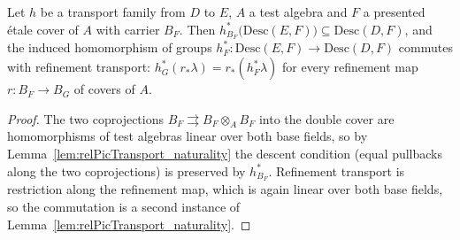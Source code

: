 \begin{lemma}
  \label{lem:relPicTransport_descent}
  \leanok
  Let \(h\) be a transport family from \(D\) to \(E\), \(A\) a test algebra and \(F\) a
  presented \'etale cover of \(A\) with carrier \(B_F\). Then
  \(h_{B_F}^{*}\bigl(\mathrm{Desc}(E, F)\bigr) \subseteq \mathrm{Desc}(D, F)\), and the
  induced homomorphism of groups
  \(h_F^{*} \colon \mathrm{Desc}(E, F) \to \mathrm{Desc}(D, F)\) commutes with refinement
  transport: \(h_{G}^{*}(r_{*}\lambda) = r_{*}(h_F^{*}\lambda)\) for every refinement map
  \(r \colon B_F \to B_G\) of covers of \(A\).
\end{lemma}
\begin{proof}
  \leanok
  The two coprojections \(B_F \rightrightarrows B_F \otimes_A B_F\) into the double cover
  are homomorphisms of test algebras linear over both base fields, so by
  Lemma~\ref{lem:relPicTransport_naturality} the descent condition
  (equal pullbacks along the two coprojections) is preserved by \(h_{B_F}^{*}\).
  Refinement transport is restriction along the refinement map, which is again linear over
  both base fields, so the commutation is a second instance of
  Lemma~\ref{lem:relPicTransport_naturality}.
\end{proof}

